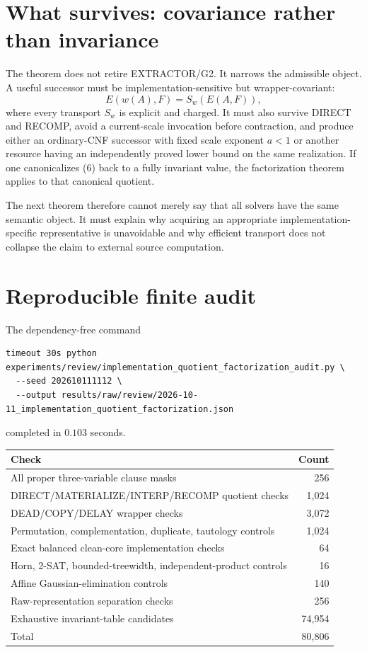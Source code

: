 \documentclass[11pt]{article}
\begin{document}
\section{What survives: covariance rather than invariance}

The theorem does not retire EXTRACTOR/G2.  It narrows the admissible object.
A useful successor must be implementation-sensitive but wrapper-covariant:
\[
 E(w(A),F)=S_w(E(A,F)),                                    \tag{6}
\]
where every transport $S_w$ is explicit and charged.  It must also survive
DIRECT and RECOMP, avoid a current-scale invocation before contraction, and
produce either an ordinary-CNF successor with fixed scale exponent $a<1$ or
another resource having an independently proved lower bound on the same
realization.  If one canonicalizes (6) back to a fully invariant value, the
factorization theorem applies to that canonical quotient.

The next theorem therefore cannot merely say that all solvers have the same
semantic object.  It must explain why acquiring an appropriate
implementation-specific representative is unavoidable and why efficient
transport does not collapse the claim to external source computation.

\section{Reproducible finite audit}

The dependency-free command
\begin{verbatim}
timeout 30s python experiments/review/implementation_quotient_factorization_audit.py \
  --seed 202610111112 \
  --output results/raw/review/2026-10-11_implementation_quotient_factorization.json
\end{verbatim}
completed in $0.103$ seconds.

\begin{center}
\begin{tabular}{lr}
\toprule
Check & Count\\
\midrule
All proper three-variable clause masks & 256\\
DIRECT/MATERIALIZE/INTERP/RECOMP quotient checks & 1,024\\
DEAD/COPY/DELAY wrapper checks & 3,072\\
Permutation, complementation, duplicate, tautology controls & 1,024\\
Exact balanced clean-core implementation checks & 64\\
Horn, 2-SAT, bounded-treewidth, independent-product controls & 16\\
Affine Gaussian-elimination controls & 140\\
Raw-representation separation checks & 256\\
Exhaustive invariant-table candidates & 74,954\\
\midrule
Total & 80,806\\
\bottomrule
\end{tabular}
\end{center}
\end{document}

